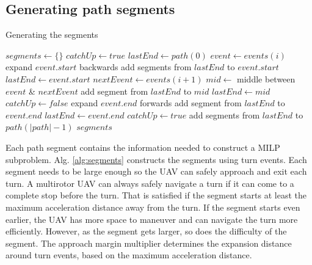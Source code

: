 \subsection{Generating path segments}
\begin{algorithm}
\caption{Generating the segments}
\label{alg:segments}
\begin{algorithmic}[1]
\State $segments \leftarrow \{\}$
\State $catchUp \leftarrow true$
\State $lastEnd \leftarrow path(0)$
\State $event \leftarrow events(i)$
	\State expand $event.start$ backwards
	\State add segments from $lastEnd$ to $event.start$
	\State $lastEnd \leftarrow event.start$
\EndIf
\State $nextEvent \leftarrow events(i+1)$
	\State $mid \leftarrow$ middle between $event$ \& $nextEvent$
	\State add segment from $lastEnd$ to $mid$
	\State $lastEnd \leftarrow mid$
	\State $catchUp \leftarrow false$
\Else
	\State expand $event.end$ forwards
	\State add segment from $lastEnd$ to $event.end$
	\State $lastEnd \leftarrow event.end$
	\State $catchUp \leftarrow true$
\EndIf
\EndFor
\State add segments from $lastEnd$ to $path(|path|-1)$
\Return $segments$
\EndFunction
\end{algorithmic}
\end{algorithm}
Each path segment contains the information needed to construct a MILP subproblem. Alg. \ref{alg:segments} constructs the segments using turn events.
Each segment needs to be large enough so the UAV can safely approach and exit each turn. A multirotor UAV can always safely navigate a turn if it can come to a complete stop before the turn. That is satisfied if the segment starts at least the maximum acceleration distance away from the turn. If the segment starts even earlier, the UAV has more space to maneuver and can navigate the turn more efficiently. However, as the segment gets larger, so does the difficulty of the segment. The approach margin multiplier determines the expansion distance around turn events, based on the maximum acceleration distance. \\

